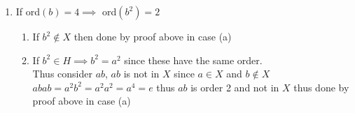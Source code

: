 \documentclass[12pt, letterpaper]{article}
\theoremstyle{definition}
\begin{document}
\begin{enumerate}
\begin{enumerate}
        \item If ord$(b)=4 \implies$ ord$(b^2)=2$
        \begin{enumerate}
            \item If $b^2 \notin X$ then done by proof above in case (a)
            \item If $b^2 \in H \implies b^2 = a^2$ since these have the same order.\\
            Thus consider $ab$, $ab$ is not in $X$ since $a \in X$ and $b \notin X$\\
            $abab=a^2b^2=a^2a^2=a^4=e$ thus $ab$ is order 2 and not in $X$ thus done by proof above in case (a)
        \end{enumerate}
    \end{enumerate}
\end{enumerate}

\newpage
\end{document}
